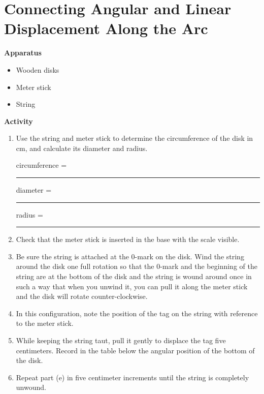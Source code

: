 \section{Connecting Angular and Linear Displacement Along the Arc}

\makelabheader %

\bigskip
\textbf{Apparatus}
\begin{itemize}[nosep]
\item Wooden disks
\item Meter stick
\item String
\end{itemize}

\bigskip
\textbf{Activity} 
\begin{enumerate}[labparts]
\item Use the string and meter stick to determine the circumference of the disk in cm, and calculate its diameter and radius.

\begin{center} 
circumference = \rule{2cm}{0.4pt} \hspace{1cm} diameter = \rule{2cm}{0.4pt} \hspace{1cm} radius = \rule{2cm}{0.4pt}
\end{center}

\item Check that the meter stick is inserted in the base with the scale visible.

\item Be sure the string is attached at the 0-mark on the disk. Wind the string around the disk one full rotation so that the 0-mark and the beginning of the string are at the bottom of the disk and the string is wound around once in such a way that when you unwind it, you can pull it along the meter stick and the disk will rotate counter-clockwise.

\item In this configuration, note the position of the tag on the string with reference to the meter stick.

\item While keeping the string taut, pull it gently to displace the tag five centimeters. Record in the table below the angular position of the bottom of the disk.

\item Repeat part (e) in five centimeter increments until the string is completely unwound.


\end{enumerate}
